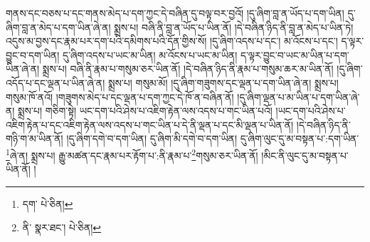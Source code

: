གནས་དང་བཅས་པ་དང་གནས་མེད་པ་དག་ཀྱང་དེ་བཞིན་དུ་བལྟ་བར་བྱའོ། །དུ་ཞིག་བླ་ན་ཡོད་པ་དག་ཡིན། དུ་ཞིག་བླ་ན་མེད་པ་དག་ཡིན་ཞེ་ན། སྨྲས་པ། བཞི་ནི་བླ་ན་ཡོད་པ་ཡིན་ནོ། །དེ་བཞིན་ཉིད་ནི་བླ་ན་མེད་པ་ཡིན་ཏེ། འདུས་མ་བྱས་དང་རྣམ་པར་དག་པའི་དམིགས་པའི་དོན་གྱིས་སོ། །དུ་ཞིག་འདས་པ་དང་། མ་འོངས་པ་དང་། ད་ལྟར་བྱུང་བ་དག་ཡིན། དུ་ཞིག་འདས་པ་ཡང་མ་ཡིན། མ་འོངས་པ་ཡང་མ་ཡིན། ད་ལྟར་བྱུང་བ་ཡང་མ་ཡིན་པ་དག་ཡིན་ཞེ་ན། སྨྲས་པ། བཞི་ནི་རྣམ་པ་གསུམ་ཅར་ཡིན་ནོ། །དེ་བཞིན་ཉིད་ནི་རྣམ་པ་གསུམ་ཆར་མ་ཡིན་ནོ། །དུ་ཞིག་འདོད་པ་དང་ལྡན་པ་ཡིན་ཞེ་ན། སྨྲས་པ། གསུམ་མོ། །དུ་ཞིག་གཟུགས་དང་ལྡན་པ་དག་ཡིན་ཞེ་ན། སྨྲས་པ། གསུམ་ཁོ་ནའོ། །གཟུགས་མེད་པ་དང་ལྡན་པ་དག་ཀྱང་དེ་ཁོ་ན་བཞིན་ནོ། །དུ་ཞིག་ལྡན་པ་མ་ཡིན་པ་དག་ཡིན་ཞེ་ན། སྨྲས་པ། གཅིག་སྟེ། ཡང་དག་པའི་ཤེས་པ་འཇིག་རྟེན་ལས་འདས་པ་གང་ཡིན་པའོ། །ཡང་དག་པའི་ཤེས་པ་འཇིག་རྟེན་པ་དང་འཇིག་རྟེན་ལས་འདས་པ་གང་ཡིན་པ་དེ་ནི་ལྡན་པ་དང་མི་ལྡན་པ་ཡིན་ནོ། །དེ་བཞིན་ཉིད་ནི་གཉི་ག་མ་ཡིན་ནོ། །དུ་ཞིག་དགེ་བ་དག་ཡིན། དུ་ཞིག་མི་དགེ་བ་དག་ཡིན། དུ་ཞིག་ལུང་དུ་མ་བསྟན་པ་:དག་ཡིན་\footnote{དག་  པེ་ཅིན། }ཞེ་ན། སྨྲས་པ། རྒྱུ་མཚན་དང་རྣམ་པར་རྟོག་པ་:ནི་རྣམ་པ་\footnote{ནི་  སྣར་ཐང་།  པེ་ཅིན། }གསུམ་ཅར་ཡིན་ནོ། །མིང་ནི་ལུང་དུ་མ་བསྟན་པ་ཡིན་ནོ། །
